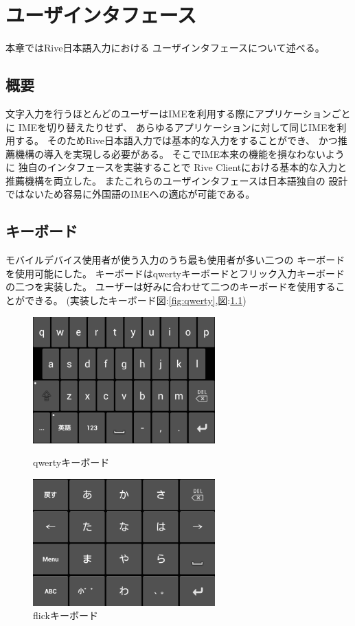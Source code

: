 \chapter{ユーザインタフェース}
\label{chap:userinterface}
本章ではRive日本語入力における
ユーザインタフェースについて述べる。

\newpage
\section{概要}
文字入力を行うほとんどのユーザーはIMEを利用する際にアプリケーションごとに
IMEを切り替えたりせず、
あらゆるアプリケーションに対して同じIMEを利用する。
そのためRive日本語入力では基本的な入力をすることができ、
かつ推薦機構の導入を実現しる必要がある。
そこでIME本来の機能を損なわないように
独自のインタフェースを実装することで
Rive Clientにおける基本的な入力と推薦機構を両立した。
またこれらのユーザインタフェースは日本語独自の
設計ではないため容易に外国語のIMEへの適応が可能である。

\section{キーボード}
モバイルデバイス使用者が使う入力のうち最も使用者が多い二つの
キーボードを使用可能にした。
キーボードはqwertyキーボードとフリック入力キーボードの二つを実装した。
ユーザーは好みに合わせて二つのキーボードを使用することができる。
(実装したキーボード図:\ref{fig:qwerty},図:\ref{fig:flick})
\begin{figure}[htbp]
  \begin{minipage}{0.5\hsize}
    \begin{center}
      \includegraphics[width=7cm,bb=0 0 417 290]{images/qwerty.png}
    \end{center}
    \caption{qwertyキーボード}
    \label{fig:qwerty}
  \end{minipage}
  \begin{minipage}{0.5\hsize}
    \begin{center}
      \includegraphics[width=7cm,bb=0 0 415 290]{images/flick.png}
    \end{center}
    \caption{flickキーボード}
    \label{fig:flick}
  \end{minipage}
\end{figure}

